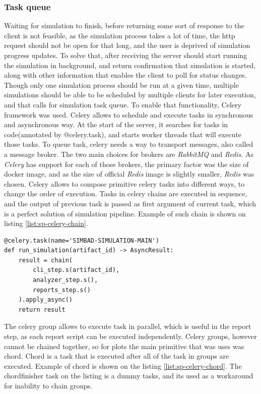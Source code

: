 \subsubsection{Task queue}
Waiting for simulation to finish, before returning some sort of response to the client is not feasible, as the simulation process takes a lot of time, the http request should not be open for that long, and the user is deprived of simulation progress updates. To solve that, after receiving the server should start running the simulation in background, and return confirmation that simulation is started, along with other information that enables the client to poll for status changes.
Though only one simulation process should be run at a given time, multiple simulations should be able to be scheduled by multiple clients for later execution, and that calls for simulation task queue. To enable that functionality, Celery framework was used. Celery allows to schedule and execute tasks in synchronous and asynchronous way. At the start of the server, it searches for tasks in code(annotated by @celery.task), and starts worker threads that will execute those tasks.
To queue task, celery needs a way to transport messages, also called a message broker. The two main choices for brokers are \textit{RabbitMQ} and \textit{Redis}. As \textit{Celery} has support for each of those brokers, the primary factor was the size of docker image, and as the size of official \textit{Redis} image is slightly smaller, \textit{Redis} was chosen.
Celery allows to compose primitive celery tasks into different ways, to change the order of execution. Tasks in celery chains are executed in sequence, and the output of previous task is passed as first argument of current task, which is a perfect solution of simulation pipeline. Example of such chain is shown on listing \ref{list:sp-celery-chain}. 
\begin{lstlisting}[label=list:sp-celery-chain,caption=Celery chain - Main Simulation task, basicstyle=\footnotesize\ttfamily]
@celery.task(name='SIMBAD-SIMULATION-MAIN')
def run_simulation(artifact_id) -> AsyncResult:
    result = chain(
        cli_step.s(artifact_id),
        analyzer_step.s(),
        reports_step.s()
    ).apply_async()
    return result
\end{lstlisting}
The celery group allows to execute task in parallel, which is useful in the report step, as each report script can be executed independently. Celery groups, however cannot be chained together, so for plots the main primitive that was uses was chord. Chord is a task that is executed after all of the task in groups are executed. Example of chord is shown on the listing \ref{list:sp-celery-chord}. The chordfinisher task on the listing is a dummy tasks, and its used as a workaround for inability to chain groups.
